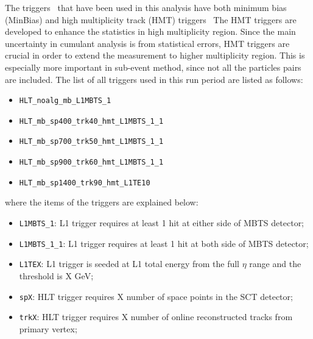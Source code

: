 The triggers~\cite{Aad:2012xs} that have been used in this analysis have both minimum bias (MinBias) and high multiplicity track (HMT) triggers~\cite{Aaboud:2016yar, Aad:2016mok} The HMT triggers are developed to enhance the statistics in high multiplicity region. Since the main uncertainty in cumulant analysis is from statistical errors, HMT triggers are crucial in order to extend the measurement to higher multiplicity region. This is especially more important in sub-event method, since not all the particles pairs are included. The list of all triggers used in this run period are listed as follows:
\begin{itemize}
\item \verb|HLT_noalg_mb_L1MBTS_1|
\item \verb|HLT_mb_sp400_trk40_hmt_L1MBTS_1_1|
\item \verb|HLT_mb_sp700_trk50_hmt_L1MBTS_1_1|
\item \verb|HLT_mb_sp900_trk60_hmt_L1MBTS_1_1|
\item \verb|HLT_mb_sp1400_trk90_hmt_L1TE10|
\end{itemize}
where the items of the triggers are explained below:
\begin{itemize}
\item \verb|L1MBTS_1|: L1 trigger requires at least 1 hit at either side of MBTS detector;
\item \verb|L1MBTS_1_1|: L1 trigger requires at least 1 hit at both side of MBTS detector;
\item \verb|L1TEX|: L1 trigger is seeded at L1 total energy from the full $\eta$ range and the threshold is X GeV;
\item \verb|spX|: HLT trigger requires X number of space points in the SCT detector;
\item \verb|trkX|: HLT trigger requires X number of online reconstructed tracks from primary vertex;
\end{itemize}

